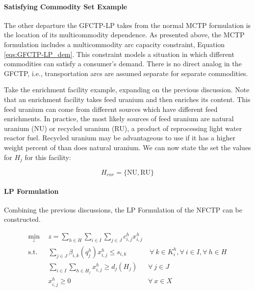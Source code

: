 \paragraph{Satisfying Commodity Set Example}

The other departure the GFCTP-LP takes from the normal MCTP formulation is the
location of its multicommodity dependence. As presented above, the
MCTP formulation includes a multicommodity arc capacity constraint, Equation
\ref{eqs:GFCTP-LP_dem}. This constraint models a
situation in which different commodities can satisfy a consumer's demand. There
is no direct analog in the GFCTP, i.e., transportation arcs are assumed separate
for separate commodities.

Take the enrichment facility example, expanding on the previous discussion. Note
that an enrichment facility takes feed uranium and then enriches its 
content. This feed uranium can come from different sources which have different
feed enrichments. In practice, the most likely sources of feed uranium are
natural uranium (NU) or recycled uranium (RU), a product of reprocessing light
water reactor fuel. Recycled uranium may be advantageous to use if it has a
higher weight percent of  than does natural uranium. We can now state the
set the values for $H_{j}$ for this facility:

\begin{equation}\label{eqs:enr-dem-commods}
  H_{enr} = \{ \mbox{NU}, \mbox{RU} \}
\end{equation}

\paragraph{LP Formulation}

Combining the previous discussions, the LP Formulation of the NFCTP can be constructed.

\begin{subequations}\label{eqs:GFCTP-LP}
  \begin{align}
    \min_{z} \:\: & 
    z = \sum_{h \in H}\sum_{i \in I}\sum_{j \in J}c_{i,j}^{h} x_{i,j}^{h} 
    & \label{eqs:GFCTP-LP_obj} \\
    \text{s.t.} \:\: &
    \sum_{j \in J}\beta_{i,k}(q_{j}^{h}) x_{i,j}^{h} \leq s_{i,k} 
    &
    \: \forall \: k \in K_{i}^{h},  
    \forall \: i \in I, \forall \: h \in H \label{eqs:GFCTP-LP_sup} \\
    &
    \sum_{i \in I}\sum_{h \in H_{j}} x_{i,j}^{h} \geq d_{j}(H_{j}) 
    & 
    \forall \: j \in J \label{eqs:GFCTP-LP_dem} \\
    &
    x^h_{i,j} \geq 0
    &
    \forall \: x \in X \label{eqs:GFCTP-LP_x}
  \end{align}
\end{subequations}

